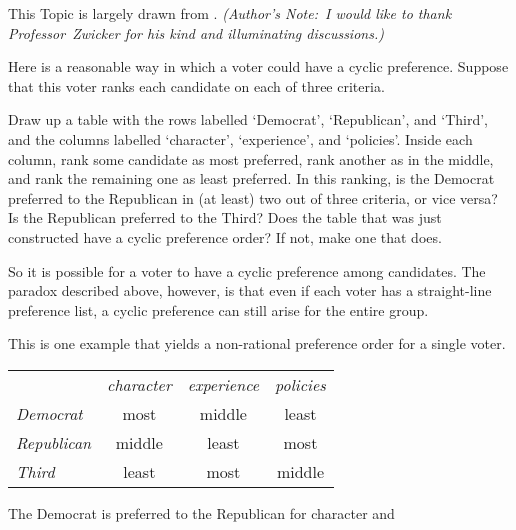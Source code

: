 This Topic is largely drawn from \cite{Zwicker}.
\emph{(Author's Note:~I would like to thank Professor~Zwicker 
for his kind and illuminating discussions.)}

\begin{exercises}
  \item \label{IrrIndVote}
    Here is a reasonable way in which a voter could have a cyclic preference.
    Suppose that this voter ranks each candidate
    on each of three criteria.
    \begin{exparts}
      \partsitem Draw up a table with the rows labelled `Democrat',
         `Republican', and `Third', and the columns labelled
         `character', `experience', and `policies'.
         Inside each column, rank some 
         candidate as most preferred, 
         rank another as in the middle, and rank the remaining one
         as least preferred.
      \partsitem In this ranking, is the Democrat preferred to the Republican
         in (at least) two out of three criteria, or vice versa?
         Is the Republican preferred to the Third?
      \partsitem  Does the table that was 
         just constructed have a cyclic preference order?
         If not, make one that does.
    \end{exparts}
    So it is possible for a voter to have a cyclic preference among candidates.
    The paradox described above, however, is that even if each voter has a
    straight-line preference list, 
    a cyclic preference can still arise for the entire group. 
    \begin{answer}
      This is one example that yields a non-rational preference order for a 
      single voter.
      \begin{center}
        \begin{tabular}{l|c|c|c|}
             \multicolumn{1}{c}{\ }
                  &\multicolumn{1}{c}{\textit{character}}
                  &\multicolumn{1}{c}{\textit{experience}}
                  &\multicolumn{1}{c}{\textit{policies}}   \\ 
          \cline{2-4}
         \textit{Democrat}   &most    &middle  &least   \\
         \textit{Republican} &middle  &least   &most    \\
         \textit{Third}      &least   &most    &middle  \\
          \cline{2-4}
        \end{tabular}
      \end{center}
      The Democrat is preferred to the Republican for character and

\end{answer}
\end{exercises}
